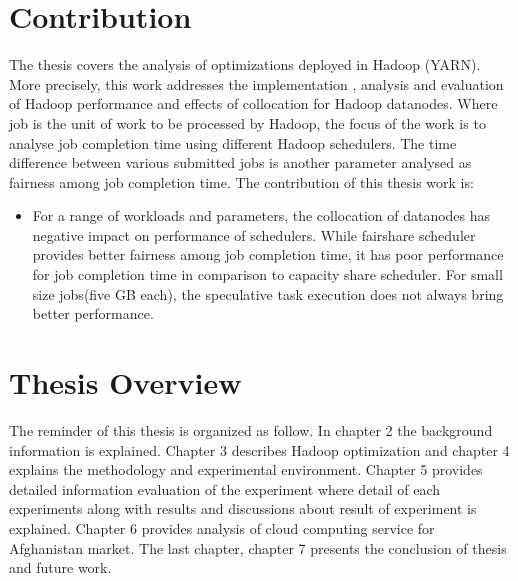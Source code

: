 \section{Contribution}

The thesis covers the analysis of optimizations deployed in Hadoop (YARN). More precisely, this work addresses the implementation , analysis and evaluation of Hadoop performance and effects of collocation for Hadoop datanodes. Where job is the unit of work to be processed by Hadoop, the focus of the work is to analyse job completion time using different Hadoop schedulers. The time difference between various submitted jobs is another parameter analysed as fairness among job completion time. The contribution of this thesis work is:
\begin{itemize}
 \item{ For a range of workloads and parameters,  the collocation of datanodes has negative impact on performance of schedulers. While fairshare scheduler provides better fairness among job completion time, it has poor performance for job completion time in comparison to capacity share scheduler. For small size jobs(five GB each), the speculative task execution does not always bring better performance.  }   
\end{itemize} 



\section{Thesis Overview}

The reminder of this thesis is organized as follow. In chapter 2 the background information is explained. Chapter 3 describes Hadoop optimization and chapter 4 explains the methodology and experimental environment. Chapter 5 provides detailed information evaluation of the experiment where detail of each experiments along with results and discussions about result of experiment is explained. Chapter 6 provides analysis of cloud computing service for Afghanistan market. The last chapter, chapter 7 presents the conclusion of thesis and future work. 
